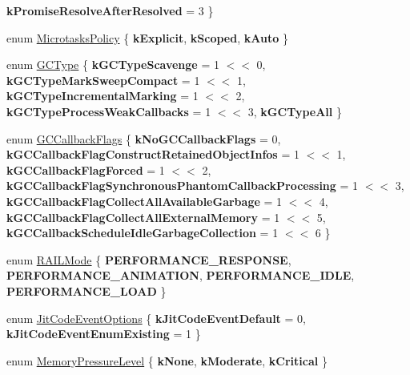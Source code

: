 \begin{DoxyCompactItemize}
{\bfseries k\+Promise\+Resolve\+After\+Resolved} = 3
 \}
\item 
enum \mbox{\hyperlink{namespacev8_a2f183b102b3d1b7a30a805e8c53c04da}{Microtasks\+Policy}} \{ {\bfseries k\+Explicit}, 
{\bfseries k\+Scoped}, 
{\bfseries k\+Auto}
 \}
\item 
enum \mbox{\hyperlink{namespacev8_ac109d6f27e0c0f9ef4e98bcf7a806cf2}{G\+C\+Type}} \{ \newline
{\bfseries k\+G\+C\+Type\+Scavenge} = 1 $<$$<$ 0, 
{\bfseries k\+G\+C\+Type\+Mark\+Sweep\+Compact} = 1 $<$$<$ 1, 
{\bfseries k\+G\+C\+Type\+Incremental\+Marking} = 1 $<$$<$ 2, 
{\bfseries k\+G\+C\+Type\+Process\+Weak\+Callbacks} = 1 $<$$<$ 3, 
\newline
{\bfseries k\+G\+C\+Type\+All}
 \}
\item 
enum \mbox{\hyperlink{namespacev8_a247c37a849f4d6c293b9b16e94e1944b}{G\+C\+Callback\+Flags}} \{ \newline
{\bfseries k\+No\+G\+C\+Callback\+Flags} = 0, 
{\bfseries k\+G\+C\+Callback\+Flag\+Construct\+Retained\+Object\+Infos} = 1 $<$$<$ 1, 
{\bfseries k\+G\+C\+Callback\+Flag\+Forced} = 1 $<$$<$ 2, 
{\bfseries k\+G\+C\+Callback\+Flag\+Synchronous\+Phantom\+Callback\+Processing} = 1 $<$$<$ 3, 
\newline
{\bfseries k\+G\+C\+Callback\+Flag\+Collect\+All\+Available\+Garbage} = 1 $<$$<$ 4, 
{\bfseries k\+G\+C\+Callback\+Flag\+Collect\+All\+External\+Memory} = 1 $<$$<$ 5, 
{\bfseries k\+G\+C\+Callback\+Schedule\+Idle\+Garbage\+Collection} = 1 $<$$<$ 6
 \}
\item 
enum \mbox{\hyperlink{namespacev8_a317cb610383138992c7200c35f8abe5f}{R\+A\+I\+L\+Mode}} \{ {\bfseries P\+E\+R\+F\+O\+R\+M\+A\+N\+C\+E\+\_\+\+R\+E\+S\+P\+O\+N\+SE}, 
{\bfseries P\+E\+R\+F\+O\+R\+M\+A\+N\+C\+E\+\_\+\+A\+N\+I\+M\+A\+T\+I\+ON}, 
{\bfseries P\+E\+R\+F\+O\+R\+M\+A\+N\+C\+E\+\_\+\+I\+D\+LE}, 
{\bfseries P\+E\+R\+F\+O\+R\+M\+A\+N\+C\+E\+\_\+\+L\+O\+AD}
 \}
\item 
enum \mbox{\hyperlink{namespacev8_a06f34fa4fa4cfc8518366808d1d461c1}{Jit\+Code\+Event\+Options}} \{ {\bfseries k\+Jit\+Code\+Event\+Default} = 0, 
{\bfseries k\+Jit\+Code\+Event\+Enum\+Existing} = 1
 \}
\item 
enum \mbox{\hyperlink{namespacev8_ae0e9a25bf51e518585f555806e7dc7b9}{Memory\+Pressure\+Level}} \{ {\bfseries k\+None}, 
{\bfseries k\+Moderate}, 
{\bfseries k\+Critical}
 \}
\end{DoxyCompactItemize}
